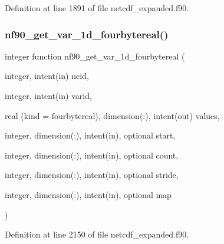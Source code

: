 Definition at line 1891 of file netcdf\+\_\+expanded.\+f90.

\mbox{\label{netcdf__expanded_8f90_a2fc97d96a4f51977806ac1685ee09d8f}} 
\subsubsection{\texorpdfstring{nf90\+\_\+get\+\_\+var\+\_\+1d\+\_\+fourbytereal()}{nf90\_get\_var\_1d\_fourbytereal()}}
{\footnotesize\ttfamily integer function nf90\+\_\+get\+\_\+var\+\_\+1d\+\_\+fourbytereal (\begin{DoxyParamCaption}\item[{integer, intent(in)}]{ncid,  }\item[{integer, intent(in)}]{varid,  }\item[{real (kind = fourbytereal), dimension(\+:), intent(out)}]{values,  }\item[{integer, dimension(\+:), intent(in), optional}]{start,  }\item[{integer, dimension(\+:), intent(in), optional}]{count,  }\item[{integer, dimension(\+:), intent(in), optional}]{stride,  }\item[{integer, dimension(\+:), intent(in), optional}]{map }\end{DoxyParamCaption})}



Definition at line 2150 of file netcdf\+\_\+expanded.\+f90.

\mbox{\label{netcdf__expanded_8f90_a1cea5b36160fa3e9a65103d421650a9c}} 
